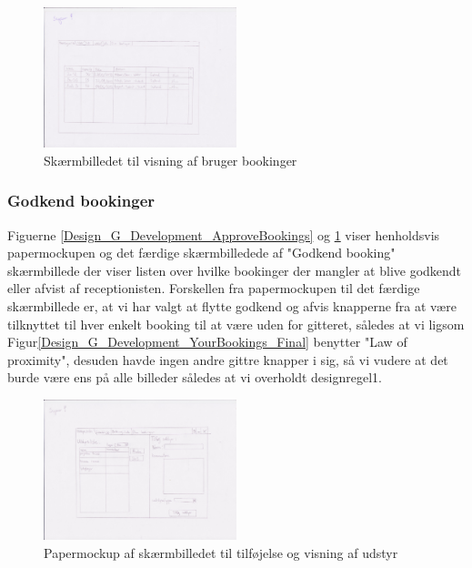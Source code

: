 \begin{figure}[h!]
  \centering
    \includegraphics[width=0.5\textwidth]{Appendix/GUI-Prototype/PaperMockup/GodkendBookinger_001}
  \caption{Skærmbilledet til visning af bruger bookinger}
\label{Design_G_Development_ApproveBookings_Final}
\end{figure}

\subsubsection{Godkend bookinger}
Figuerne \ref{Design_G_Development_ApproveBookings} og \ref{Design_G_Development_ApproveBookings_Final} viser henholdsvis papermockupen og det færdige skærmbilledede af "Godkend booking" skærmbillede der viser listen over hvilke bookinger der mangler at blive godkendt eller afvist af receptionisten. Forskellen fra papermockupen til det færdige skærmbillede er, at vi har valgt at flytte godkend og afvis knapperne fra at være tilknyttet til hver enkelt booking til at være uden for gitteret, således at vi ligsom Figur\ref{Design_G_Development_YourBookings_Final} benytter "Law of proximity", desuden havde ingen andre gittre knapper i sig, så vi vudere at det burde være ens på alle billeder således at vi overholdt designregel1.

\begin{figure}[h!]
  \centering
    \includegraphics[width=0.5\textwidth]{Appendix/GUI-Prototype/PaperMockup/UdstyrsListe}
  \caption{Papermockup af skærmbilledet til tilføjelse og visning af udstyr}
\label{Design_G_Development_EquipmentList}
\end{figure}

